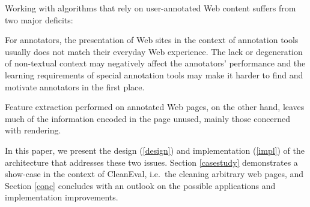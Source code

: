 Working with algorithms that rely on user-annotated Web content suffers from two major deficits:

For annotators, the presentation of Web sites in the context of annotation tools usually does not match their everyday Web experience.
The lack or degeneration of non-textual context may negatively affect the annotators' performance
and the learning requirements of special annotation tools may make it harder to find and motivate annotators in the first place.

Feature extraction performed on annotated Web pages, on the other hand, leaves much of the information encoded in the page unused,
mainly those concerned with rendering.

In this paper, we present the design (\ref{design}) and implementation (\ref{impl}) of the {\KrdWrd} architecture that addresses these two issues.
Section \ref{casestudy} demonstrates a show-case in the context of CleanEval, i.e.~the cleaning arbitrary web pages,
and Section \ref{conc} concludes with an outlook on the possible applications and implementation improvements.
